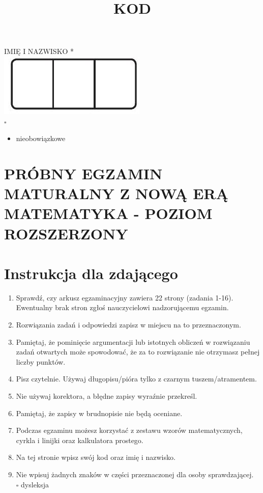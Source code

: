 \documentclass[10pt]{article}
\title{KOD }
\author{}
\date{}
\begin{document}
\maketitle
IMIĘ I NAZWISKO *\\
\includegraphics[max width=\textwidth, center]{2024_11_21_f29375993e8c629c464fg-01}\\
\(\square\)

\begin{itemize}
  \item nieobowiązkowe
\end{itemize}

\section*{PRÓBNY EGZAMIN MATURALNY Z NOWĄ ERĄ MATEMATYKA - POZIOM ROZSZERZONY}
\section*{Instrukcja dla zdającego}
\begin{enumerate}
  \item Sprawdź, czy arkusz egzaminacyjny zawiera 22 strony (zadania 1-16). Ewentualny brak stron zgłoś nauczycielowi nadzorującemu egzamin.
  \item Rozwiązania zadań i odpowiedzi zapisz w miejscu na to przeznaczonym.
  \item Pamiętaj, że pominięcie argumentacji lub istotnych obliczeń w rozwiązaniu zadań otwartych może spowodować, że za to rozwiązanie nie otrzymasz pełnej liczby punktów.
  \item Pisz czytelnie. Używaj długopisu/pióra tylko z czarnym tuszem/atramentem.
  \item Nie używaj korektora, a błędne zapisy wyraźnie przekreśl.
  \item Pamiętaj, że zapisy w brudnopisie nie będą oceniane.
  \item Podczas egzaminu możesz korzystać z zestawu wzorów matematycznych, cyrkla i linijki oraz kalkulatora prostego.
  \item Na tej stronie wpisz swój kod oraz imię i nazwisko.
  \item Nie wpisuj żadnych znaków w części przeznaczonej dla osoby sprawdzającej.\\
\(\square\) dysleksja
\end{enumerate}
\end{document}
